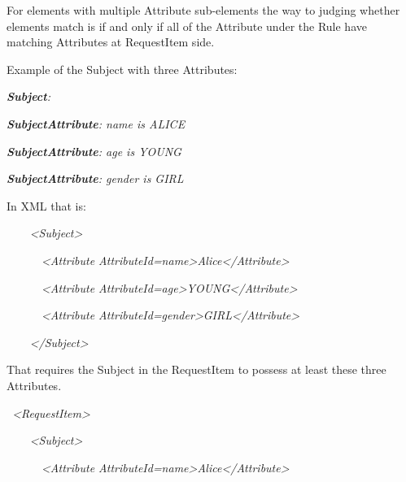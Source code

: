 \documentclass[a4paper]{article}
\begin{document}
{\color{black}
For elements with multiple Attribute sub-elements the way to judging
whether elements match is if and only if all of the Attribute under the
Rule have matching Attributes at RequestItem side.}

{\color{black}
Example of the Subject with three Attributes:}

{\upshape\color{black}
\foreignlanguage{english}{\textbf{\textit{Subject}}}\foreignlanguage{english}{\textit{:}}}

{\color{black}
\foreignlanguage{english}{\textbf{\textit{SubjectAttribute}}}\foreignlanguage{english}{\textit{:
name is ALICE}}}

{\color{black}
\foreignlanguage{english}{\textbf{\textit{SubjectAttribute}}}\foreignlanguage{english}{\textit{:
age is YOUNG}}}

{\color{black}
\foreignlanguage{english}{\textbf{\textit{SubjectAttribute}}}\foreignlanguage{english}{\textit{:
gender is GIRL}}}

{\color{black}
In XML that is:}

{\itshape\color{black}
\ \ \ \ {\textless}Subject{\textgreater}}

{\itshape\color{black}
\ \ \ \ \ \ {\textless}Attribute
AttributeId={\textquotedbl}name{\textquotedbl}{\textgreater}Alice{\textless}/Attribute{\textgreater}}

{\itshape\color{black}
\ \ \ \ \ \ {\textless}Attribute
AttributeId={\textquotedbl}age{\textgreater}YOUNG{\textless}/Attribute{\textgreater}}

{\itshape\color{black}
\ \ \ \ \ \ {\textless}Attribute
AttributeId={\textquotedbl}gender{\textgreater}GIRL{\textless}/Attribute{\textgreater}}

{\itshape\color{black}
\ \ \ \ {\textless}/Subject{\textgreater}}

{\color{black}
That requires the Subject in the RequestItem to possess at least these
three Attributes.}

{\itshape\color{black}
\ {\textless}RequestItem{\textgreater}}

{\itshape\color{black}
\ \ \ \ {\textless}Subject{\textgreater}}

{\itshape\color{black}
\ \ \ \ \ \ {\textless}Attribute
AttributeId={\textquotedbl}name{\textquotedbl}{\textgreater}Alice{\textless}/Attribute{\textgreater}}
\end{document}
